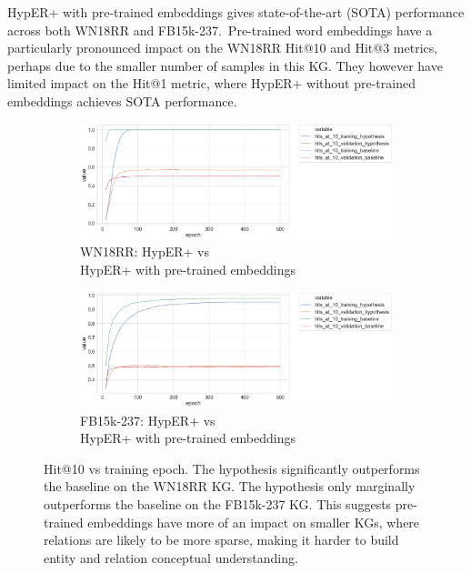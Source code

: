 \noindent HypER+ with pre-trained embeddings gives state-of-the-art (SOTA) performance across both WN18RR and FB15k-237.\ Pre-trained word embeddings have a particularly pronounced impact on the WN18RR Hit@10 and Hit@3 metrics, perhaps due to the smaller number of samples in this KG. They however have limited impact on the Hit@1 metric, where HypER+ without pre-trained embeddings achieves SOTA performance.



\begin{figure}
	\begin{subfigure}[b]{.5\linewidth}
   		\centering
    		\includegraphics[width=1.0\linewidth, height=0.5\linewidth]{WN18RR_hits_at_10_Results_ptwv}
		\captionsetup{justification=centering}
		\caption{WN18RR: HypER+ vs \\ HypER+ with pre-trained embeddings}
	\end{subfigure}
	\begin{subfigure}[b]{.5\linewidth}
   		\centering
		\includegraphics[width=1.0\linewidth, height=0.5\linewidth]{FB15k-237_hits_at_10_Results_ptwv}
		\captionsetup{justification=centering}
		\caption{FB15k-237: HypER+ vs \\ HypER+ with pre-trained embeddings}
	\end{subfigure}
	\captionsetup{justification=centering}
	\caption{Hit@10 vs training epoch. The hypothesis significantly outperforms the baseline on the WN18RR KG. The hypothesis only marginally outperforms the baseline on the FB15k-237 KG. This suggests pre-trained embeddings have more of an impact on smaller KGs, where relations are likely to be more sparse, making it harder to build entity and relation conceptual understanding.}
\end{figure}


